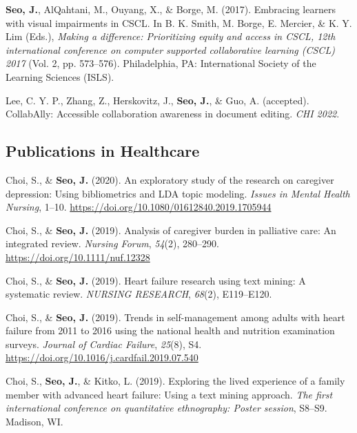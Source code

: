 \documentclass[11pt,a4paper,]{awesome-cv}
\begin{document}
\leavevmode{}%
\textbf{Seo, J.}, AlQahtani, M., Ouyang, X., \& Borge, M. (2017).
Embracing learners with visual impairments in CSCL. In B. K. Smith, M.
Borge, E. Mercier, \& K. Y. Lim (Eds.), \emph{Making a difference:
    Prioritizing equity and access in CSCL, 12th international conference on
    computer supported collaborative learning (CSCL) 2017} (Vol. 2, pp.
573--576). Philadelphia, PA: International Society of the Learning
Sciences (ISLS).

\leavevmode{}%
Lee, C. Y. P., Zhang, Z., Herskovitz, J., \textbf{Seo, J.}, \& Guo, A.
(accepted). CollabAlly: Accessible collaboration awareness in document
editing. \emph{CHI 2022}.

\hypertarget{publications-in-healthcare}{%
    \subsection{Publications in
        Healthcare}\label{publications-in-healthcare}}

\hypertarget{refs_healthcare}{}
\leavevmode{}%
Choi, S., \& \textbf{Seo, J.} (2020). An exploratory study of the
research on caregiver depression: Using bibliometrics and LDA topic
modeling. \emph{Issues in Mental Health Nursing}, 1--10.
\url{https://doi.org/10.1080/01612840.2019.1705944}

\leavevmode{}%
Choi, S., \& \textbf{Seo, J.} (2019). Analysis of caregiver burden in
palliative care: An integrated review. \emph{Nursing Forum},
\emph{54}(2), 280--290. \url{https://doi.org/10.1111/nuf.12328}

\leavevmode{}%
Choi, S., \& \textbf{Seo, J.} (2019). Heart failure research using text
mining: A systematic review. \emph{NURSING RESEARCH}, \emph{68}(2),
E119--E120.

\leavevmode{}%
Choi, S., \& \textbf{Seo, J.} (2019). Trends in self-management among
adults with heart failure from 2011 to 2016 using the national health
and nutrition examination surveys. \emph{Journal of Cardiac Failure},
\emph{25}(8), S4. \url{https://doi.org/10.1016/j.cardfail.2019.07.540}

\leavevmode{}%
Choi, S., \textbf{Seo, J.}, \& Kitko, L. (2019). Exploring the lived
experience of a family member with advanced heart failure: Using a text
mining approach. \emph{The first international conference on
    quantitative ethnography: Poster session}, S8--S9. Madison, WI.
\end{document}
